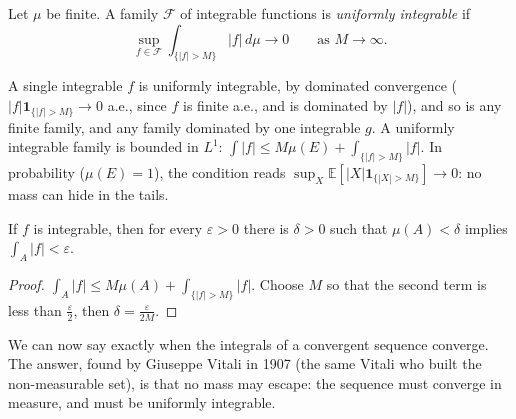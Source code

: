 \begin{definition}
Let $\mu$ be finite. A family $\mathcal F$ of integrable functions is \emph{uniformly integrable} if
\[\sup_{f\in\mathcal F}\int_{\{|f|>M\}}|f|\,d\mu\longrightarrow0\qquad\text{as }M\to\infty.\]
\end{definition}

A single integrable $f$ is uniformly integrable, by dominated convergence ($|f|\mathbf 1_{\{|f|>M\}}\to0$ a.e., since $f$ is finite a.e., and is dominated by $|f|$), and so is any finite family, and any
family dominated by one integrable $g$. A uniformly integrable family is bounded in $L^1$: $\int|f|\le M\mu(E)+\int_{\{|f|>M\}}|f|$. In probability ($\mu(E)=1$), the condition reads
$\sup_X\mathbb E[|X|\mathbf 1_{\{|X|>M\}}]\to0$: no mass can hide in the tails.

\begin{lemma}\label{lem:abscont}
If $f$ is integrable, then for every $\varepsilon>0$ there is $\delta>0$ such that $\mu(A)<\delta$ implies $\int_A|f|<\varepsilon$.
\end{lemma}
\begin{proof}
$\int_A|f|\le M\mu(A)+\int_{\{|f|>M\}}|f|$. Choose $M$ so that the second term is less than $\frac\varepsilon2$, then $\delta=\frac\varepsilon{2M}$.
\end{proof}

We can now say exactly when the integrals of a convergent sequence converge. The answer, found by Giuseppe Vitali in 1907 (the
same Vitali who built the non-measurable set), is that no mass may escape: the sequence must converge in measure, and must be
uniformly integrable.


